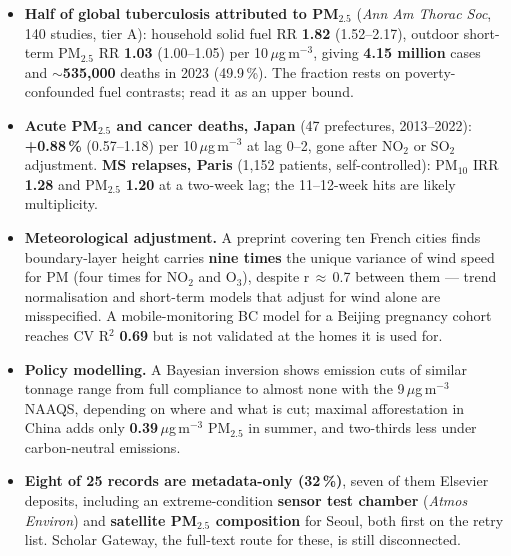 \documentclass[10pt]{article}
\begin{document}
\footnotesize
\begin{itemize}

\item \textbf{Half of global tuberculosis attributed to PM$_{2.5}$} (\textit{Ann Am Thorac Soc}, 140
studies, tier A): household solid fuel RR \textbf{1.82} (1.52--2.17), outdoor short-term PM$_{2.5}$ RR
\textbf{1.03} (1.00--1.05) per 10\,$\mu$g\,m$^{-3}$, giving \textbf{4.15 million} cases and $\sim$\textbf{535,000}
deaths in 2023 (49.9\,\%). The fraction rests on poverty-confounded fuel contrasts; read it as an
upper bound.

\item \textbf{Acute PM$_{2.5}$ and cancer deaths, Japan} (47 prefectures, 2013--2022): \textbf{+0.88\,\%}
(0.57--1.18) per 10\,$\mu$g\,m$^{-3}$ at lag 0--2, gone after NO$_2$ or SO$_2$ adjustment. \textbf{MS
relapses, Paris} (1,152 patients, self-controlled): PM$_{10}$ IRR \textbf{1.28} and PM$_{2.5}$ \textbf{1.20} at a
two-week lag; the 11--12-week hits are likely multiplicity.

\item \textbf{Meteorological adjustment.} A preprint covering ten French cities finds boundary-layer height carries
\textbf{nine times} the unique variance of wind speed for PM (four times for NO$_2$ and O$_3$), despite r\,$\approx$\,0.7 between them ---
trend normalisation and short-term models that adjust for wind alone are misspecified. A mobile-monitoring BC
model for a Beijing pregnancy cohort reaches CV R$^2$ \textbf{0.69} but is not validated at the homes it is
used for.

\item \textbf{Policy modelling.} A Bayesian inversion shows emission cuts of similar tonnage range from full
compliance to almost none with the 9\,$\mu$g\,m$^{-3}$ NAAQS, depending on where and what is cut; maximal
afforestation in China adds only \textbf{0.39}\,$\mu$g\,m$^{-3}$ PM$_{2.5}$ in summer, and two-thirds less under
carbon-neutral emissions.

\item \textbf{Eight of 25 records are metadata-only (32\,\%)}, seven of them Elsevier deposits, including an
extreme-condition \textbf{sensor test chamber} (\textit{Atmos Environ}) and \textbf{satellite PM$_{2.5}$
composition} for Seoul, both first on the retry list. Scholar Gateway, the full-text route for these,
is still disconnected.

\end{itemize}

\vspace{2mm}
\end{document}
